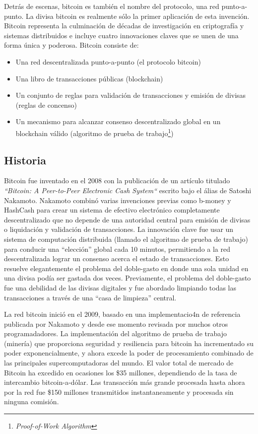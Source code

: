 \documentclass[10pt,journal,compsoc]{IEEEtran}
\begin{document}
Detrás de escenas, bitcoin es también el nombre del protocolo, una red punto-a-punto. La divisa bitcoin es realmente sólo la primer aplicación de esta invención. Bitcoin representa la culminación de décadas de investigación en criptografía y sistemas distribuidos e incluye cuatro innovaciones claves que se unen de una forma única y poderosa. Bitcoin consiste de:
\begin{itemize}
    \item Una red descentralizada punto-a-punto (el protocolo bitcoin)
    \item Una libro de transacciones públicas (blockchain)
    \item Un conjunto de reglas para validación de transacciones y emisión de divisas (reglas de concenso)
    \item Un mecanismo para alcanzar consenso descentralizado global en un blockchain válido (algoritmo de prueba de trabajo\footnote{\emph{Proof-of-Work Algorithm}})
\end{itemize}

\subsection{Historia}
Bitcoin fue inventado en el 2008 con la publicación de un artículo titulado \emph{``Bitcoin: A Peer-to-Peer Electronic Cash System``} escrito bajo el álias de Satoshi Nakamoto. Nakamoto combinó varias invenciones previas como b-money y HashCash para crear un sistema de efectivo electrónico completamente descentralizado que no depende de una autoridad central para emisión de divisas o liquidación y validación de transacciones. La innovación clave fue usar un sistema de computación distribuida (llamado el algoritmo de prueba de trabajo) para conducir una ``elección'' global cada 10 minutos, permitiendo a la red descentralizada lograr un consenso acerca el estado de transacciones. Esto resuelve elegantemente el problema del doble-gasto en donde una sola unidad en una divisa podía ser gastada dos veces. Previamente, el problema del doble-gasto fue una debilidad de las divisas digitales y fue abordado limpiando todas las transacciones a través de una ``casa de limpieza'' central.

La red bitcoin inició en el 2009, basado en una implementacio4n de referencia publicada por Nakamoto y desde ese momento revisada por muchos otros programadadores. La implementación del algoritmo de prueba de trabajo (minería) que proporciona seguridad y resiliencia para bitcoin ha incrementado su poder exponencialmente, y ahora excede la poder de procesamiento combinado de las principales supercomputadoras del mundo. El valor total de mercado de Bitcoin ha excedido en ocasiones los \$35 millones, dependiendo de la tasa de intercambio bitcoin-a-dólar. Las transacción más grande procesada hasta ahora por la red fue \$150 millones transmitidos instantaneamente y procesada sin ninguna comisión.
\end{document}
